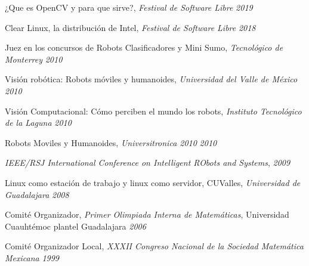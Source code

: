 \begin{loneinnerlist}
  \item ¿Que es OpenCV y para que sirve?, \emph{Festival de Software Libre} \hfill{\emph{2019}}
  \item Clear Linux, la distribución de Intel, \emph{Festival de Software Libre} \hfill{\emph{2018}}
  \item Juez en los concursos de Robots Clasificadores y Mini Sumo,
        \emph{Tecnológico de Monterrey} \hfill{\emph{2010}}
  \item Visión robótica: Robots móviles y humanoides, \emph{Universidad del
        Valle de México} \hfill{\emph{2010}}
  \item Visión Computacional: Cómo perciben el mundo los robots,
        \emph{Instituto Tecnológico de la Laguna} \hfill{\emph{2010}}
  \item Robots Moviles y Humanoides, \emph{Universitronica 2010}
        \hfill{\emph{2010}}
  \item \emph{IEEE/RSJ International Conference on Intelligent RObots
        and Systems}, \hfill{\emph{2009}}
  \item Linux como estación de trabajo y linux como servidor,
        CUValles, \emph{Universidad de Guadalajara} \hfill{\emph{2008}}
  \item Comité Organizador, \emph{Primer Olimpiada Interna de Matemáticas},
        Universidad Cuauh\-témoc plantel Guadalajara \hfill{\emph{2006}}
  \item Comité Organizador Local, \emph{XXXII Congreso Nacional de la  Sociedad
        Matemática Mexicana} \hfill{\emph{1999}}
\end{loneinnerlist}
